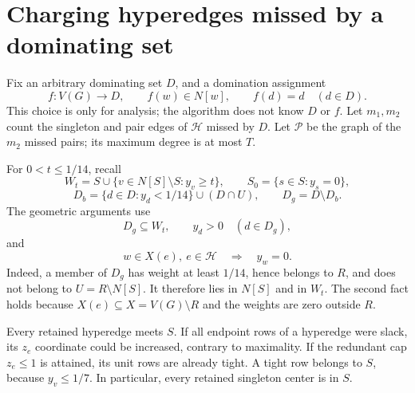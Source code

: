 \documentclass[11pt,a4paper]{article}
\theoremstyle{definition}
\theoremstyle{remark}
\begin{document}
\section{Charging hyperedges missed by a dominating set}
\label{sec:charging}

Fix an arbitrary dominating set $D$, and a domination assignment
\[
 f:V(G)\to D,\qquad f(w)\in N[w],\qquad f(d)=d\quad(d\in D).
\]
This choice is only for analysis; the algorithm does not know $D$ or
$f$. Let $m_1,m_2$ count the singleton and pair edges of $\mathcal H$
missed by $D$. Let $\mathcal P$ be the graph of the $m_2$ missed pairs;
its maximum degree is at most $T$.

For $0<t\leq1/14$, recall
\[
 W_t=S\cup\{v\in N[S]\setminus S:y_v\geq t\},\qquad
 S_0=\{s\in S:y_s=0\},
\]
\[
 D_b=\{d\in D:y_d<1/14\}\cup(D\cap U),\qquad D_g=D\setminus D_b.
\]
The geometric arguments use
\begin{equation}\label{geom:good-in-level}
 D_g\subseteq W_t,\qquad y_d>0\quad(d\in D_g),
\end{equation}
and
\begin{equation}\label{geom:common-zero}
 w\in X(e),\ e\in\mathcal H\quad\Longrightarrow\quad y_w=0.
\end{equation}
Indeed, a member of $D_g$ has weight at least $1/14$, hence belongs to
$R$, and does not belong to $U=R\setminus N[S]$. It therefore lies in
$N[S]$ and in $W_t$. The second fact holds because
$X(e)\subseteq X=V(G)\setminus R$ and the weights are zero outside $R$.

Every retained hyperedge meets $S$. If all endpoint rows of a hyperedge
were slack, its $z_e$ coordinate could be increased, contrary to
maximality. If the redundant cap $z_e\leq1$ is attained, its unit rows
are already tight. A tight row belongs to $S$, because $y_v\leq1/7$.
In particular, every retained singleton center is in $S$.
\end{document}
